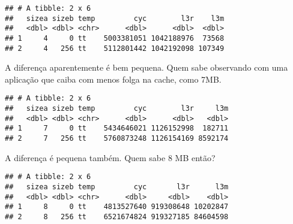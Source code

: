 \documentclass[
]{article}
\newenvironment{Shaded}{\begin{snugshade}}{\end{snugshade}}
\newcommand{\DecValTok}[1]{\textcolor[rgb]{0.00,0.00,0.81}{#1}}
\newcommand{\NormalTok}[1]{#1}
\newcommand{\OperatorTok}[1]{\textcolor[rgb]{0.81,0.36,0.00}{\textbf{#1}}}
\newcommand{\StringTok}[1]{\textcolor[rgb]{0.31,0.60,0.02}{#1}}
\begin{document}
\begin{verbatim}
## # A tibble: 2 x 6
##   sizea sizeb temp         cyc        l3r    l3m
##   <dbl> <dbl> <chr>      <dbl>      <dbl>  <dbl>
## 1     4     0 tt    5003381051 1042188976  73568
## 2     4   256 tt    5112801442 1042192098 107349
\end{verbatim}

A diferença aparentemente é bem pequena. Quem sabe observando com uma
aplicação que caiba com menos folga na cache, como 7MB.

\begin{Shaded}
\end{Shaded}

\begin{verbatim}
## # A tibble: 2 x 6
##   sizea sizeb temp         cyc        l3r     l3m
##   <dbl> <dbl> <chr>      <dbl>      <dbl>   <dbl>
## 1     7     0 tt    5434646021 1126152998  182711
## 2     7   256 tt    5760873248 1126154169 8592174
\end{verbatim}

A diferença é pequena também. Quem sabe 8 MB então?

\begin{Shaded}
\end{Shaded}

\begin{verbatim}
## # A tibble: 2 x 6
##   sizea sizeb temp         cyc       l3r      l3m
##   <dbl> <dbl> <chr>      <dbl>     <dbl>    <dbl>
## 1     8     0 tt    4813527640 919308648 10202847
## 2     8   256 tt    6521674824 919327185 84604598
\end{verbatim}
\end{document}
